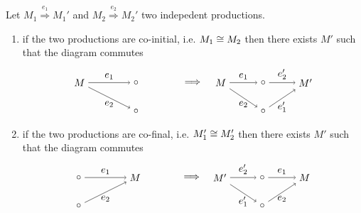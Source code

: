 \begin{lemma}
\label{lem:rewrite_concurrent}
  Let $M_1\overset{e_1}{\Rightarrow} M_1'$ and $M_2\overset{e_2}{\Rightarrow} M_2'$ two indepedent productions.
  \begin{enumerate}
  \item if the two productions are co-initial, i.e. $M_1\cong M_2$ then there exists $M'$ such that the diagram commutes
  \[
  \begin{tikzpicture} %
    \node (m2) at (0,0) {\(\circ\)};
    \node (m1) at (0,1) {\(\circ\)};
    \node (m) at (-2,1) {\(M\)};
    \node (implies) at (2,1) {\(\implies\)};
    \node (mm2) at (4.5,0) {\(\circ\)};
    \node (mm1) at (4.5,1) {\(\circ\)};
    \node (n) at (6,1) {\(M'\)};
    \node (mm) at (3,1) {\(M\)};
    \draw [->] (m) -- node [left,above] {\(e_1\)} (m1);
    \draw [->] (m) -- node [left,below] {\(e_2\)} (m2);
    \draw [->] (mm) -- node [left,above] {\(e_1\)} (mm1);
    \draw [->] (mm) -- node [left,below] {\(e_2\)} (mm2);
    \draw [->] (mm1) -- node [left,above] {\(e_2'\)} (n);
    \draw [->] (mm2) -- node [left,below] {\(e_1'\)} (n);
  \end{tikzpicture}
  \]

  \item if the two productions are co-final, i.e. $M_1'\cong M_2'$ then there exists $M'$ such that the diagram commutes
  \[
  \begin{tikzpicture} %
    \node (m2) at (-2,0) {\(\circ\)};
    \node (m1) at (-2,1) {\(\circ\)};
    \node (m) at (0,1) {\(M\)};
    \node (implies) at (2,1) {\(\implies\)};
    \node (mm2) at (4.5,0) {\(\circ\)};
    \node (mm1) at (4.5,1) {\(\circ\)};
    \node (n) at (3,1) {\(M'\)};
    \node (mm) at (6,1) {\(M\)};
    \draw [->] (m1) -- node [left,above] {\(e_1\)} (m);
    \draw [->] (m2) -- node [left,below] {\(e_2\)} (m);
    \draw [->] (mm1) -- node [left,above] {\(e_1\)} (mm);
    \draw [->] (mm2) -- node [left,below] {\(e_2\)} (mm);
    \draw [->] (n) -- node [left,above] {\(e_2'\)} (mm1);
    \draw [->] (n) -- node [left,below] {\(e_1'\)} (mm2);
  \end{tikzpicture}
  \]
  \end{enumerate}
\end{lemma}

